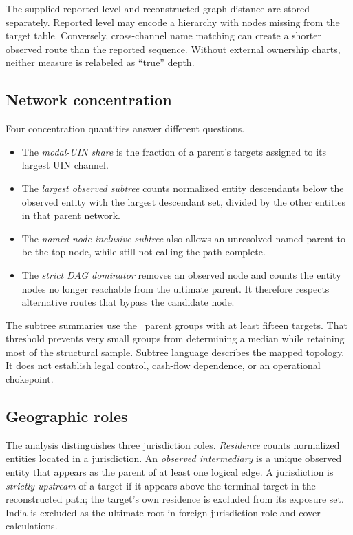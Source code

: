 \documentclass[11pt]{article}
\begin{document}
The supplied reported level and reconstructed graph distance are stored
separately. Reported level may encode a hierarchy with nodes missing from the
target table. Conversely, cross-channel name matching can create a shorter
observed route than the reported sequence. Without external ownership charts,
neither measure is relabeled as ``true'' depth.

\subsection{Network concentration}

Four concentration quantities answer different questions.

\begin{itemize}
  \item The \emph{modal-UIN share} is the fraction of a parent's targets
  assigned to its largest UIN channel.
  \item The \emph{largest observed subtree} counts normalized entity
  descendants below the observed entity with the largest descendant set,
  divided by the other entities in that parent network.
  \item The \emph{named-node-inclusive subtree} also allows an unresolved
  named parent to be the top node, while still not calling the path complete.
  \item The \emph{strict DAG dominator} removes an observed node and counts the
  entity nodes no longer reachable from the ultimate parent. It therefore
  respects alternative routes that bypass the candidate node.
\end{itemize}

The subtree summaries use the \ConcentrationParents\ parent groups with at
least fifteen targets. That threshold prevents very small groups from
determining a median while retaining most of the structural sample. Subtree
language describes the mapped topology. It does not establish legal control,
cash-flow dependence, or an operational chokepoint.

\subsection{Geographic roles}

The analysis distinguishes three jurisdiction roles. \emph{Residence} counts
normalized entities located in a jurisdiction. An \emph{observed
intermediary} is a unique observed entity that appears as the parent of at
least one logical edge. A jurisdiction is \emph{strictly upstream} of a target
if it appears above the terminal target in the reconstructed path; the target's
own residence is excluded from its exposure set. India is excluded as the
ultimate root in foreign-jurisdiction role and cover calculations.
\end{document}
